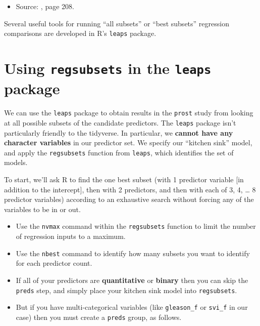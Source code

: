 \documentclass[]{book}
\providecommand{\tightlist}{%
  \setlength{\itemsep}{0pt}\setlength{\parskip}{0pt}}
\theoremstyle{definition}
\theoremstyle{definition}
\theoremstyle{definition}
\theoremstyle{remark}
\begin{document}
\begin{itemize}
\tightlist
\item
  Source: \citet{Hastie2001}, page 208.
\end{itemize}

Several useful tools for running ``all subsets'' or ``best subsets''
regression comparisons are developed in R's \texttt{leaps} package.

\section{\texorpdfstring{Using \texttt{regsubsets} in the \texttt{leaps}
package}{Using regsubsets in the leaps package}}\label{using-regsubsets-in-the-leaps-package}

We can use the \texttt{leaps} package to obtain results in the
\texttt{prost} study from looking at all possible subsets of the
candidate predictors. The \texttt{leaps} package isn't particularly
friendly to the tidyverse. In particular, we \textbf{cannot have any
character variables} in our predictor set. We specify our ``kitchen
sink'' model, and apply the \texttt{regsubsets} function from
\texttt{leaps}, which identifies the set of models.

To start, we'll ask R to find the one best subset (with 1 predictor
variable {[}in addition to the intercept{]}, then with 2 predictors, and
then with each of 3, 4, \ldots{} 8 predictor variables) according to an
exhaustive search without forcing any of the variables to be in or out.

\begin{itemize}
\tightlist
\item
  Use the \texttt{nvmax} command within the \texttt{regsubsets} function
  to limit the number of regression inputs to a maximum.
\item
  Use the \texttt{nbest} command to identify how many subsets you want
  to identify for each predictor count.
\item
  If all of your predictors are \textbf{quantitative} or \textbf{binary}
  then you can skip the \texttt{preds} step, and simply place your
  kitchen sink model into \texttt{regsubsets}.
\item
  But if you have multi-categorical variables (like \texttt{gleason\_f}
  or \texttt{svi\_f} in our case) then you must create a \texttt{preds}
  group, as follows.
\end{itemize}
\end{document}
